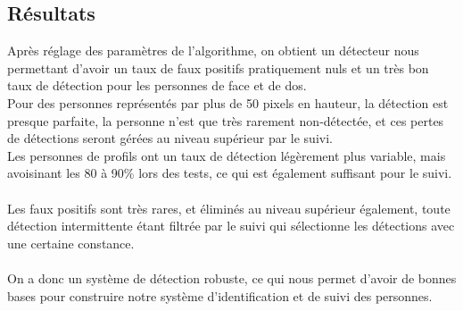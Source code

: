 \documentclass[12pt]{article}
\begin{document}
\subsection{Résultats}
Après réglage des paramètres de l'algorithme, on obtient un détecteur nous permettant d'avoir un taux de faux positifs pratiquement nuls et un très bon taux de détection pour les personnes de face et de dos.\\
Pour des personnes représentés par plus de 50 pixels en hauteur, la détection est presque parfaite, la personne n'est que très rarement non-détectée, et ces pertes de détections seront gérées au niveau supérieur par le suivi.\\
Les personnes de profils ont un taux de détection légèrement plus variable, mais avoisinant les 80 à 90\% lors des tests, ce qui est également suffisant pour le suivi.\\
\\
Les faux positifs sont très rares, et éliminés au niveau supérieur également, toute détection intermittente étant filtrée par le suivi qui sélectionne les détections avec une certaine constance.\\
\\
On a donc un système de détection robuste, ce qui nous permet d'avoir de bonnes bases pour construire notre système d'identification et de suivi des personnes.
\end{document}
